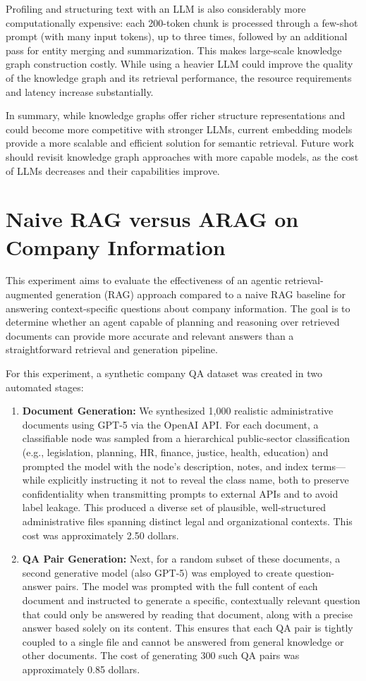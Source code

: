 Profiling and structuring text with an LLM is also considerably more computationally expensive: each 200-token chunk is processed through a few-shot prompt (with many input tokens), up to three times, followed by an additional pass for entity merging and summarization. This makes large-scale knowledge graph construction costly. While using a heavier LLM could improve the quality of the knowledge graph and its retrieval performance, the resource requirements and latency increase substantially.

In summary, while knowledge graphs offer richer structure representations and could become more competitive with stronger \glspl{LLM}, current embedding models provide a more scalable and efficient solution for semantic retrieval. Future work should revisit knowledge graph approaches with more capable models, as the cost of \glspl{LLM} decreases and their capabilities improve.

\section{Naive \gls{RAG} versus \gls{ARAG} on Company Information}
\label{sec:expNaiveVsAgenticRAG}
This experiment aims to evaluate the effectiveness of an agentic retrieval-augmented generation (\gls{RAG}) approach compared to a naive \gls{RAG} baseline for answering context-specific questions about company information. The goal is to determine whether an agent capable of planning and reasoning over retrieved documents can provide more accurate and relevant answers than a straightforward retrieval and generation pipeline.

For this experiment, a synthetic company QA dataset was created in two automated stages:
\begin{enumerate}
        \item \textbf{Document Generation:} We synthesized 1{,}000 realistic administrative documents using \gls{GPT}-5 via the OpenAI API. For each document, a classifiable node was sampled from a hierarchical public-sector classification (e.g., legislation, planning, HR, finance, justice, health, education) and prompted the model with the node's description, notes, and index terms—while explicitly instructing it not to reveal the class name, both to preserve confidentiality when transmitting prompts to external APIs and to avoid label leakage. This produced a diverse set of plausible, well-structured administrative files spanning distinct legal and organizational contexts. This cost was approximately 2.50 dollars.
        \item \textbf{QA Pair Generation:} \label{subsec:qa-generation} Next, for a random subset of these documents, a second generative model (also \gls{GPT}-5) was employed to create question-answer pairs. The model was prompted with the full content of each document and instructed to generate a specific, contextually relevant question that could only be answered by reading that document, along with a precise answer based solely on its content. This ensures that each QA pair is tightly coupled to a single file and cannot be answered from general knowledge or other documents. The cost of generating 300 such QA pairs was approximately 0.85 dollars.
\end{enumerate}

